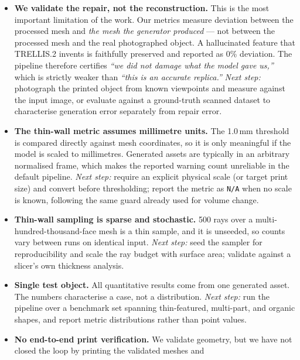 \documentclass[11pt,a4paper]{article}
\begin{document}
\begin{itemize}[leftmargin=*]
  \item \textbf{We validate the repair, not the reconstruction.} This is the
        most important limitation of the work. Our metrics measure deviation
        between the processed mesh and \emph{the mesh the generator produced}
        --- not between the processed mesh and the real photographed object. A
        hallucinated feature that TRELLIS.2 invents is faithfully preserved and
        reported as 0\% deviation. The pipeline therefore certifies
        \emph{``we did not damage what the model gave us,''} which is strictly
        weaker than \emph{``this is an accurate replica.''}
        \emph{Next step:} photograph the printed object from known viewpoints
        and measure against the input image, or evaluate against a
        ground-truth scanned dataset to characterise generation error
        separately from repair error.
  \item \textbf{The thin-wall metric assumes millimetre units.} The 1.0\,mm
        threshold is compared directly against mesh coordinates, so it is only
        meaningful if the model is scaled to millimetres. Generated assets are
        typically in an arbitrary normalised frame, which makes the reported
        warning count unreliable in the default pipeline.
        \emph{Next step:} require an explicit physical scale (or target print
        size) and convert before thresholding; report the metric as
        \texttt{N/A} when no scale is known, following the same guard already
        used for volume change.
  \item \textbf{Thin-wall sampling is sparse and stochastic.} 500 rays over a
        multi-hundred-thousand-face mesh is a thin sample, and it is unseeded,
        so counts vary between runs on identical input.
        \emph{Next step:} seed the sampler for reproducibility and scale the
        ray budget with surface area; validate against a slicer's own
        thickness analysis.
  \item \textbf{Single test object.} All quantitative results come from one
        generated asset. The numbers characterise a case, not a distribution.
        \emph{Next step:} run the pipeline over a benchmark set spanning
        thin-featured, multi-part, and organic shapes, and report metric
        distributions rather than point values.
  \item \textbf{No end-to-end print verification.} We validate geometry, but
        we have not closed the loop by printing the validated meshes and

\end{itemize}
\end{document}
